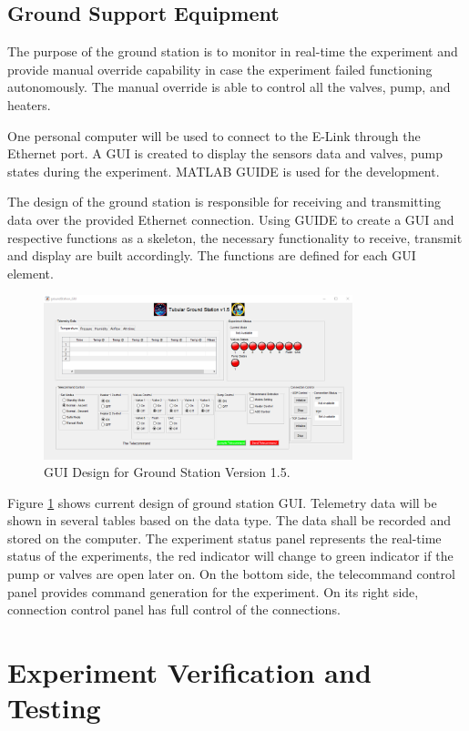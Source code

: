 \documentclass[a4paper,12pt,twoside]{article}
\begin{document}
\subsection{Ground Support Equipment}\label{sec:4.9}
The purpose of the ground station is to monitor in real-time the experiment and provide manual override capability in case the experiment failed functioning autonomously. The manual override is able to control all the valves, pump, and heaters. \par
One personal computer will be used to connect to the E-Link through the Ethernet port. A GUI is created to display the sensors data and valves, pump states during the experiment. MATLAB GUIDE is used for the development. \par
The design of the ground station is responsible for receiving and transmitting data over the provided Ethernet connection. Using GUIDE to create a GUI and respective functions as a skeleton, the necessary  functionality to receive, transmit and display are built accordingly. The functions are defined for each GUI element.
\begin{figure}[H]
    \centering
    \includegraphics[width=0.8\textwidth]{4-experiment-design/img/GS-GUI2.png}
    \caption{GUI Design for Ground Station Version 1.5.}
    \label{fig:guiDesign}
\end{figure}
Figure \ref{fig:guiDesign} shows current design of ground station GUI. Telemetry data will be shown in several tables based on the data type. The data shall be recorded and stored on the computer. The experiment status panel represents the real-time status of the experiments, the red indicator will change to green indicator if the pump or valves are open later on. On the bottom side, the telecommand control panel provides command generation for the experiment. On its right side, connection control panel has full control of the connections.


\raggedbottom
\raggedbottom
\pagebreak
\section{Experiment Verification and Testing}
\end{document}
